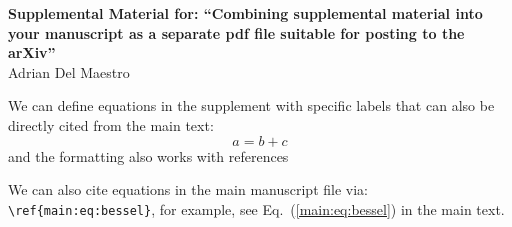 \documentclass[10pt,twocolumn,prl,aps,floatfix,superscriptaddress,longbibliography]{revtex4-1}
\begin{document}
\clearpage
\pagebreak
\setcounter{page}{1}
\onecolumngrid
\widetext
\begin{center}
    \textbf{{\large Supplemental Material for: ``Combining supplemental material into your manuscript as a separate pdf file suitable for posting to the arXiv''}}\\[1em]
    Adrian Del Maestro
\end{center}

We can define equations in the supplement with specific labels that can also be directly cited from the main text:
\begin{equation}
    a = b + c
    \label{eq:abc}
\end{equation}
and the formatting also works with references \cite{Sengupta:2018pv,Barghathi:2018cu}

We can also cite equations in the main manuscript file via: \verb!\ref{main:eq:bessel}!, for example, see Eq.~(\ref{main:eq:bessel}) in the main text.



\end{document}
